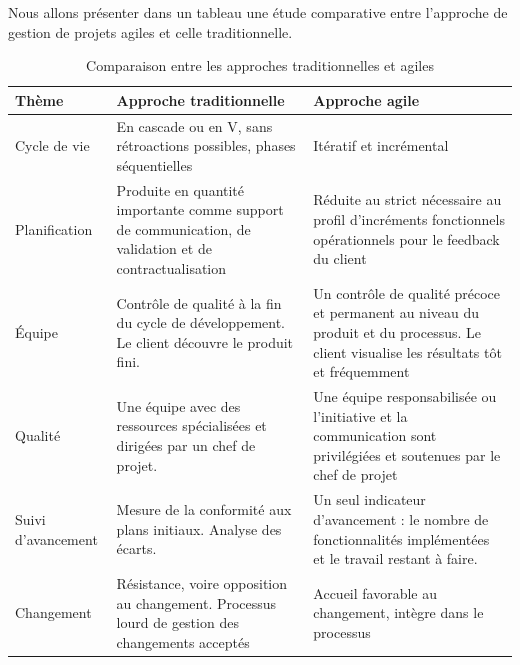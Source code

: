Nous allons présenter dans un tableau une étude comparative entre l’approche de gestion de projets agiles et celle traditionnelle.


\begin{table}[H]
	\centering
	\caption{Comparaison entre les approches traditionnelles et agiles}
	\label{tab:my-table}
	\begin{tabular}{|l|p{5cm}|p{6cm}|}
		\hline
		\textbf{Thème}      & \textbf{Approche traditionnelle}                                                                       & \textbf{Approche agile}                                                                                                                                              \\ \hline
		Cycle de vie        & En cascade ou en V, sans rétroactions possibles, phases séquentielles                                  & Itératif et incrémental                                                                                                                                              \\ \hline
		Planification       & Produite en quantité importante comme support de communication, de validation et de contractualisation & Réduite au strict nécessaire au profil d’incréments fonctionnels opérationnels pour le feedback du client                                                            \\ \hline
		Équipe              & Contrôle de qualité à la fin du cycle de développement. Le client découvre le produit fini.            & Un contrôle de qualité précoce et permanent au niveau du produit et du processus. Le client visualise les résultats tôt et fréquemment                               \\ \hline
		Qualité             & Une équipe avec des ressources spécialisées et dirigées par un chef de projet.                         & Une équipe responsabilisée ou l’initiative et la communication sont privilégiées et soutenues par le chef de projet                                                  \\ \hline
		Suivi d’avancement  & Mesure de la conformité aux plans initiaux. Analyse des écarts.                                        & Un seul indicateur d’avancement : le nombre de fonctionnalités implémentées et le travail restant à faire.                                                           \\ \hline
		Changement          & Résistance, voire opposition au changement. Processus lourd de gestion des changements acceptés        & Accueil favorable au changement, intègre dans le processus                                                                                                           \\ \hline

\end{tabular}
\end{table}

